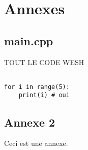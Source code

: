\appendix
\chapter*{Annexes}
\renewcommand{\thesection}{\Alph{section}}


\section{main.cpp}
\label{appendix:main.cpp}

TOUT LE CODE WESH


\begin{verbatim}

for i in range(5):
    print(i) # oui

\end{verbatim}

\newpage
\section{Annexe 2}
\label{appendix:2}
Ceci est une annexe.
